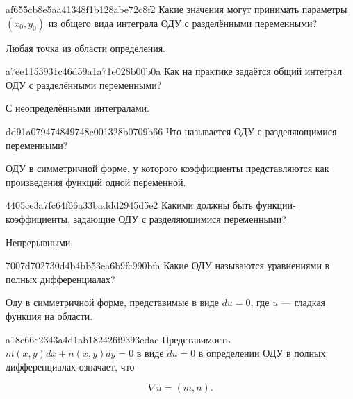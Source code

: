 \begin{note}{af655cb8e5aa41348f1b128abe72c8f2}
    Какие значения могут принимать параметры \({ (x_0, y_0) }\) из общего вида интеграла ОДУ с разделёнными переменными?

    \begin{cloze}{1}
        Любая точка из области определения.
    \end{cloze}
\end{note}

\begin{note}{a7ee1153931c46d59a1a71e028b00b0a}
    Как на практике задаётся общий интеграл ОДУ с разделёнными переменными?

    \begin{cloze}{1}
        С неопределёнными интегралами.
    \end{cloze}
\end{note}

\begin{note}{dd91a079474849748c001328b0709b66}
    Что называется ОДУ с разделяющимися переменными?

    \begin{cloze}{1}
        ОДУ в симметричной форме, у которого коэффициенты представляются как произведения функций одной переменной.
    \end{cloze}
\end{note}

\begin{note}{4405ce3a7fc64f66a33baddd2945d5e2}
    Какими должны быть функции-коэффициенты, задающие ОДУ с разделяющимися переменными?

    \begin{cloze}{1}
        Непрерывными.
    \end{cloze}
\end{note}

\begin{note}{7007d702730d4b4bb53ea6b9fc990bfa}
    Какие ОДУ называются уравнениями в полных дифференциалах?

    \begin{cloze}{1}
        Оду в симметричной форме, представимые в виде \({ du = 0 }\), где \({ u }\) --- гладкая функция на области.
    \end{cloze}
\end{note}

\begin{note}{a18c66c2343a4d1ab182426f9393edac}
    Представимость \({ m(x, y) dx + n(x, y) dy = 0 }\) в виде \({ du = 0 }\) в определении ОДУ в полных дифференциалах означает, что
    \begin{icloze}{1}
        \[
            \nabla u = (m, n).
        \]
    \end{icloze}
\end{note}

